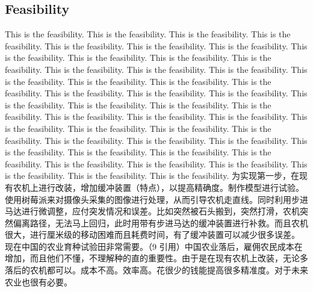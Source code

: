 \documentclass[12pt]{article}
\begin{document}
\begin{flushleft}
\subsection{Feasibility}
This is the feasibility. This is the feasibility. This is the feasibility. This is the feasibility. This is the feasibility. This is the feasibility. This is the feasibility. This is the feasibility. This is the feasibility. This is the feasibility. This is the feasibility. This is the feasibility. This is the feasibility. This is the feasibility. This is the feasibility. This is the feasibility. This is the feasibility. This is the feasibility. This is the feasibility. This is the feasibility. This is the feasibility. This is the feasibility. This is the feasibility. This is the feasibility. This is the feasibility. This is the feasibility. This is the feasibility. This is the feasibility. This is the feasibility. This is the feasibility. This is the feasibility. This is the feasibility. This is the feasibility. This is the feasibility. This is the feasibility. This is the feasibility. This is the feasibility. This is the feasibility. This is the feasibility. This is the feasibility. This is the feasibility. \cite{vis2006survey}This is the feasibility. This is the feasibility. This is the feasibility. This is the feasibility. 
为实现第一步，在现有农机上进行改装，增加缓冲装置（特点），以提高精确度。制作模型进行试验。使用树莓派来对摄像头采集的图像进行处理，从而引导农机走直线。同时利用步进马达进行微调整，应付突发情况和误差。比如突然被石头搬到，突然打滑，农机突然偏离路径，无法马上回归，此时用带有步进马达的缓冲装置进行补救。而且农机很大，进行厘米级的移动困难而且耗费时间，有了缓冲装置可以减少很多误差。
现在中国的农业育种试验田非常需要。（9 引用）中国农业落后，雇佣农民成本在增加，而且他们不懂，不理解种的直的重要性。由于是在现有农机上改装，无论多落后的农机都可以。成本不高。效率高。花很少的钱能提高很多精准度。对于未来农业也很有必要。


\end{flushleft}
\end{document}
